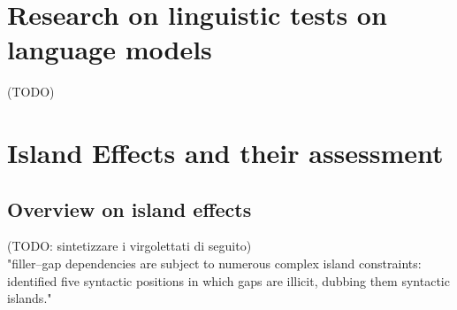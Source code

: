  
 










\section{Research on linguistic tests on language models}
(TODO)


\section{Island Effects and their assessment}

\subsection{Overview on island effects}

(TODO: sintetizzare i virgolettati di seguito) \\

"filler–gap dependencies are subject to numerous complex island constraints:  \citet{ross1968constraints} identified five syntactic positions in which gaps are illicit, dubbing them syntactic islands." \citep{wilcox2018rnn} \\

